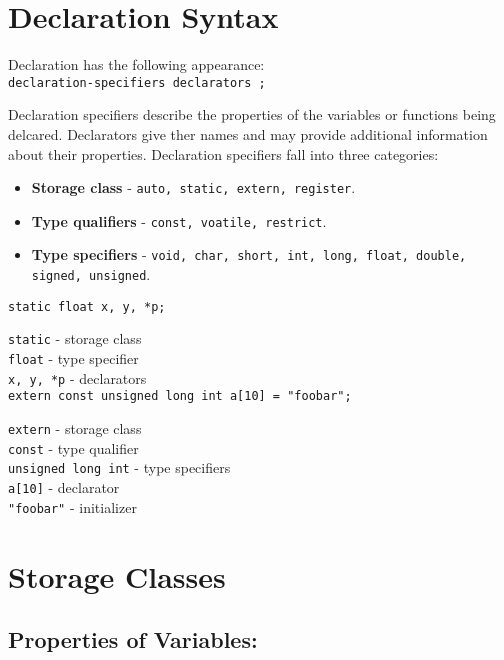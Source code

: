 \documentclass[openany]{book}
\begin{document}
    \section{Declaration Syntax}

    Declaration has the following appearance: \\
    \texttt{declaration-specifiers declarators ;}

    \bigskip

    Declaration specifiers describe the properties of the variables or functions being delcared. Declarators give ther names and may provide additional information about their properties. Declaration specifiers fall into three categories:
    \begin{itemize}
        \item \textbf{Storage class} - \texttt{auto, static, extern, register}.
        \item \textbf{Type qualifiers} - \texttt{const, voatile, restrict}.
        \item \textbf{Type specifiers} - \texttt{void, char, short, int, long, float, double, signed, unsigned}.
    \end{itemize}

    \bigskip

    \texttt{static float x, y, *p;}

    \bigskip
    \texttt{static} - storage class \\
    \texttt{float} - type specifier \\
    \texttt{x, y, *p} - declarators \\

    \texttt{extern const unsigned long int a[10] = "foobar";}

    \bigskip
    \texttt{extern} - storage class \\
    \texttt{const} - type qualifier \\
    \texttt{unsigned long int} - type specifiers \\
    \texttt{a[10]} - declarator \\
    \texttt{"foobar"} - initializer \\

    \section{Storage Classes}

    \subsection*{Properties of Variables:}
\end{document}
